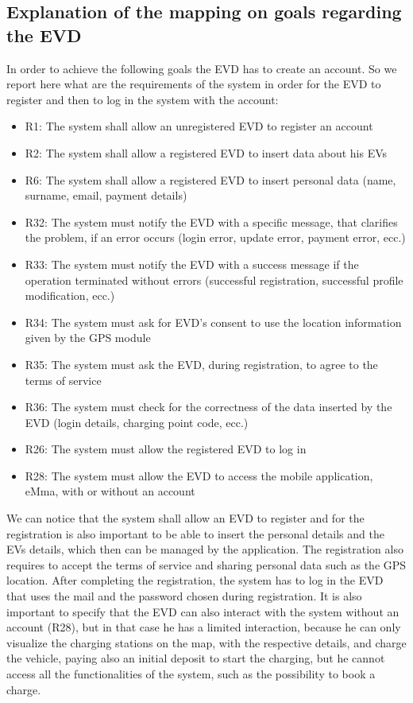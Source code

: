 \subsection{Explanation of the mapping on goals regarding the EVD}
In order to achieve the following goals the EVD has to create an account. So we report here what are the requirements of the system in order for the EVD to register and then to log in the system with the account:
\begin{itemize}
    \item R1: The system shall allow an unregistered EVD to register an account
    \item R2: The system shall allow a registered EVD to insert data about his EVs
    \item R6: The system shall allow a registered EVD to insert personal data (name, surname, email, payment details)
    \item R32: The system must notify the EVD with a specific message, that clarifies the problem, if an error occurs (login error, update error, payment error, ecc.)
    \item R33: The system must notify the EVD with a success message if the operation terminated without errors (successful registration, successful profile modification, ecc.)
    \item R34: The system must ask for EVD's consent to use the location information given by the GPS module
    \item R35: The system must ask the EVD, during registration, to agree to the terms of service
    \item R36: The system must check for the correctness of the data inserted by the EVD (login details, charging point code, ecc.)
    \item R26: The system must allow the registered EVD to log in
    \item R28: The system must allow the EVD to access the mobile application, eMma, with or without an account
\end{itemize}
We can notice that the system shall allow an EVD to register and for the registration is also important to be able to insert the personal details and the EVs details, which then can be managed by the application. The registration also requires to accept the terms of service and sharing personal data such as the GPS location. After completing the registration, the system has to log in the EVD that uses the mail and the password chosen during registration. It is also important to specify that the EVD can also interact with the system without an account (R28), but in that case he has a limited interaction, because he can only visualize the charging stations on the map, with the respective details, and charge the vehicle, paying also an initial deposit to start the charging, but he cannot access all the functionalities of the system, such as the possibility to book a charge.\\\\
